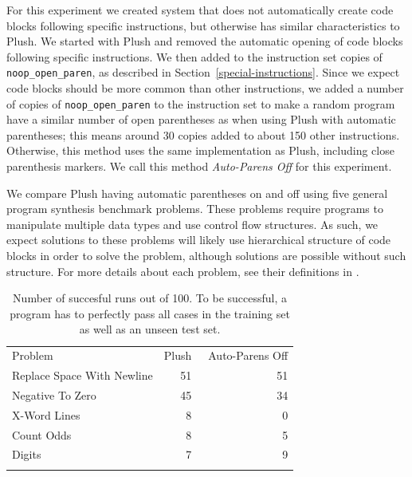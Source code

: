 \documentclass[graybox]{svmult}
\begin{document}
For this experiment we created system that does not automatically create code blocks following specific instructions, but otherwise has similar characteristics to Plush. We started with Plush and removed the automatic opening of code blocks following specific instructions. We then added to the instruction set copies of \texttt{noop\_open\_paren}, as described in Section~\ref{special-instructions}. Since we expect code blocks should be more common than other instructions, we added a number of copies of \texttt{noop\_open\_paren} to the instruction set to make a random program have a similar number of open parentheses as when using Plush with automatic parentheses; this means around 30 copies added to about 150 other instructions. Otherwise, this method uses the same implementation as Plush, including close parenthesis markers. We call this method \textit{Auto-Parens Off} for this experiment.

We compare Plush having automatic parentheses on and off using five general program synthesis benchmark problems. These problems require programs to manipulate multiple data types and use control flow structures. As such, we expect solutions to these problems will likely use hierarchical structure of code blocks in order to solve the problem, although solutions are possible without such structure. For more details about each problem, see their definitions in \cite{Helmuth:2015:GECCO}.

\begin{table}[t]
\centering
\caption{
Number of succesful runs out of 100. To be successful, a program has to perfectly pass all cases in the training set as well as an unseen test set.
}
\label{no-auto-parens-experiment}       %
%
%
\begin{tabular}{l r r}
\hline\noalign{\smallskip}
Problem                    & Plush & ~Auto-Parens Off \\
\noalign{\smallskip}\svhline\noalign{\smallskip}
Replace Space With Newline &  51 & 51 \\
Negative To Zero           &  45 & 34 \\
X-Word Lines               &   8 &  0 \\
Count Odds                 &   8 &  5 \\
Digits                     &   7 &  9 \\
\noalign{\smallskip}\hline\noalign{\smallskip}
\end{tabular}
\end{table}
\end{document}
